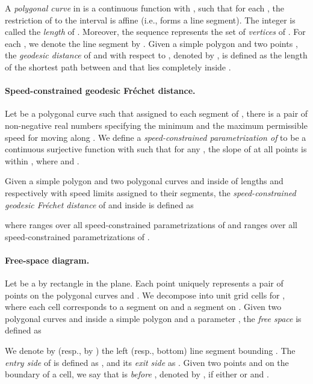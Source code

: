 \documentclass[12pt]{dalthesis}
\newcommand{\Frechet}{Fr\'echet }
\begin{document}
A {\em polygonal curve\/} in  is  a continuous function 
 with , 
such that for each ,
the restriction of  to the interval  
is affine (i.e., forms a line segment).
The integer  is called the {\em length\/} of .
Moreover, the sequence  represents the set of {\em vertices\/} of .
For each , 
we denote the line segment  by . 
Given a simple polygon  and two points ,
the \emph{geodesic distance} of  and  with respect to ,
denoted by ,
is defined as the length of the shortest path between  and 
that lies completely inside .


\paragraph{Speed-constrained geodesic \Frechet distance.}
Let  be a polygonal curve such that
assigned to each segment  of ,
there is a pair of non-negative real numbers  
specifying the minimum and the maximum permissible speed for moving along .
We define a {\em speed-constrained parametrization of \/}
to be a continuous surjective function  with 
such that for any ,
the slope of  at all points  is within , where
 and .

Given a simple polygon 
and two polygonal curves  and  inside 
of lengths  and  respectively 
with speed limits assigned to their segments, 
the {\em speed-constrained geodesic \Frechet distance\/} of  and  inside 
is defined as

where  ranges over all speed-constrained parametrizations of  
and  ranges over all speed-constrained parametrizations of .


\paragraph{Free-space diagram.}
Let  be a  by  rectangle  in the plane.
Each point  uniquely represents a pair of points
 on the polygonal curves  and .
We decompose  into
 unit grid cells 
for ,
where each cell  corresponds to
a segment  on  and a segment  on .
Given  two polygonal curves  and  inside a simple polygon 
and a parameter ,
the {\em free space\/}  is defined as

We denote by  (resp., by ) the left (resp., bottom) line segment bounding . 
The {\em entry side\/} of  is defined as ,
and its {\em exit side\/} as . 
Given two points  and  on the boundary of a cell, we say that 
 is {\em before\/} , denoted by , if either  or 
 and .
\end{document}
